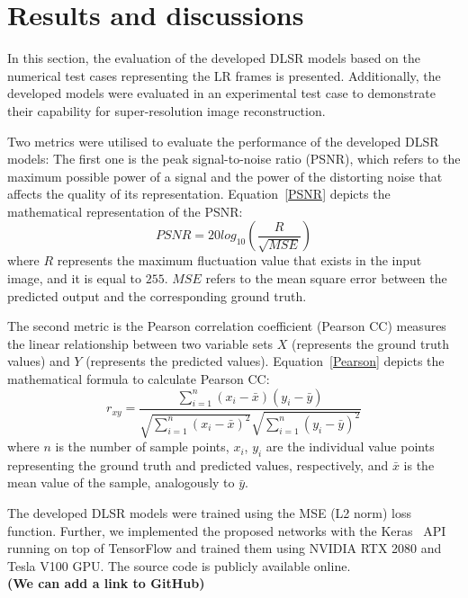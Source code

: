 \section{Results and discussions}
In this section, the evaluation of the developed DLSR models based on the numerical test cases representing the LR frames is presented.
Additionally, the developed models were evaluated in an experimental test case to demonstrate their capability for super-resolution image reconstruction.

Two metrics were utilised to evaluate the performance of the developed DLSR models:
The first one is the peak signal-to-noise ratio (PSNR), which refers to the maximum possible power of a signal and the power of the distorting noise that affects the quality of its representation.
Equation~\ref{PSNR} depicts the mathematical representation of the PSNR:
\begin{equation}
	PSNR=20log_{10}\left(\frac{R}{\sqrt{MSE}}\right)
	\label{PSNR}
\end{equation}
where \(R\) represents the maximum fluctuation value that exists in the input image, and it is equal to \(255\).
\(MSE\) refers to the mean square error between the predicted output and the corresponding ground truth.

The second metric is the Pearson correlation coefficient (Pearson CC) measures the linear relationship between two variable sets \textbf{\(X\)} (represents the ground truth values) and \textbf{\(Y\)} (represents the predicted values).
Equation~\ref{Pearson} depicts the mathematical formula to calculate Pearson CC:
\begin{equation}
	r_{xy} = \frac{\sum_{i=1}^{n}(x_i - \bar{x})(y_i-\bar{y})}{\sqrt{\sum_{i=1}^{n}(x_i - \bar{x})^2}\sqrt{\sum_{i=1}^{n}(y_i - \bar{y})^2}}
	\label{Pearson}
\end{equation}
where \(n\) is the number of sample points, \(x_i\), \(y_i\) are the individual value points representing the ground truth and predicted values, respectively, and \(\bar{x}\) is the mean value of the sample, analogously to \(\bar{y}\).

The developed DLSR models were trained using the MSE (L2 norm) loss function.
Further, we implemented the proposed networks with the Keras~\cite{chollet2015keras} API running on top of TensorFlow and trained them using NVIDIA RTX 2080 and Tesla V100 GPU. 
The source code is publicly available online. \\
\textbf{(We can add a link to GitHub)}
\clearpage
